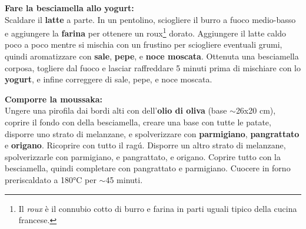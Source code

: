 \textbf{Fare la besciamella allo yogurt:} \\
Scaldare il \textbf{latte} a parte. 
In un pentolino, sciogliere il burro a fuoco medio-basso e aggiungere la \textbf{farina} per ottenere un roux\footnote{Il \textit{roux} è il connubio cotto di burro e farina in parti uguali tipico della cucina francese.} dorato.
Aggiungere il latte caldo poco a poco mentre si mischia con un frustino per sciogliere eventuali grumi, quindi aromatizzare con \textbf{sale}, \textbf{pepe}, e \textbf{noce moscata}. 
Ottenuta una besciamella corposa, togliere dal fuoco e lasciar raffreddare 5 minuti prima di mischiare con lo \textbf{yogurt}, e infine correggere di sale, pepe, e noce moscata. 

\textbf{Comporre la moussaka:} \\ 
Ungere una pirofila dai bordi alti con dell'\textbf{olio di oliva} (base $\sim$26x20 cm), coprire il fondo con della besciamella, creare una base con tutte le patate, disporre uno strato di melanzane, e spolverizzare con \textbf{parmigiano}, \textbf{pangrattato} e \textbf{origano}.
Ricoprire con tutto il ragú.
Disporre un altro strato di melanzane, spolverizzarle con parmigiano, e pangrattato, e origano.
Coprire tutto con la besciamella, quindi completare con pangrattato e parmigiano.
Cuocere in forno preriscaldato a 180°C per $\sim$45 minuti. 



\begin{recipeblock}
	
\end{recipeblock}
